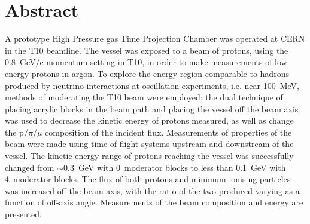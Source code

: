 \section*{Abstract}

A prototype High Pressure gas Time Projection Chamber was operated at CERN in the T10 beamline. The vessel was exposed to a beam of protons, using the 0.8~GeV/c momentum setting in T10, in order to make measurements of low energy protons in argon.
To explore the energy region comparable to hadrons produced by neutrino interactions at oscillation experiments, i.e. near 100~MeV, methods of moderating the T10 beam were employed:
the dual technique of placing acrylic blocks in the beam path and placing the vessel off the beam axis was used to decrease the kinetic energy of protons measured, as well as change the p/$\pi$/$\mu$ composition of the incident flux.
Measurements of properties of the beam were made using time of flight systems upstream and downstream of the vessel. 
The kinetic energy range of protons reaching the vessel was successfully changed from $\sim$0.3~GeV with 0~moderator blocks to less than 0.1~GeV with 4~moderator blocks.
The flux of both protons and minimum ionising particles was increased off the beam axis, with the ratio of the two produced varying as a function of off-axis angle. 
Measurements of the beam composition and energy are presented.


